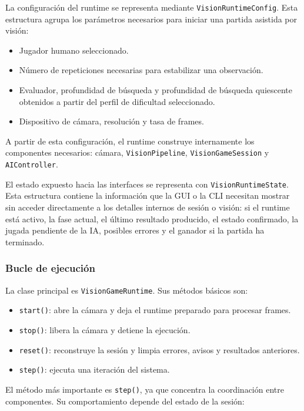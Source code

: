 La configuración del runtime se representa mediante \texttt{VisionRuntimeConfig}. Esta estructura agrupa los parámetros necesarios para iniciar una partida asistida por visión:

\begin{itemize}
    \item Jugador humano seleccionado.
    \item Número de repeticiones necesarias para estabilizar una observación.
    \item Evaluador, profundidad de búsqueda y profundidad de búsqueda quiescente obtenidos a partir del perfil de dificultad seleccionado.
    \item Dispositivo de cámara, resolución y tasa de frames.
\end{itemize}

A partir de esta configuración, el runtime construye internamente los componentes necesarios: cámara, \texttt{VisionPipeline}, \texttt{VisionGameSession} y \texttt{AIController}.

El estado expuesto hacia las interfaces se representa con \texttt{VisionRuntimeState}. Esta estructura contiene la información que la GUI o la CLI necesitan mostrar sin acceder directamente a los detalles internos de sesión o visión: si el runtime está activo, la fase actual, el último resultado producido, el estado confirmado, la jugada pendiente de la IA, posibles errores y el ganador si la partida ha terminado.

\subsubsection{Bucle de ejecución}

La clase principal es \texttt{VisionGameRuntime}. Sus métodos básicos son:

\begin{itemize}
    \item \texttt{start()}: abre la cámara y deja el runtime preparado para procesar frames.
    \item \texttt{stop()}: libera la cámara y detiene la ejecución.
    \item \texttt{reset()}: reconstruye la sesión y limpia errores, avisos y resultados anteriores.
    \item \texttt{step()}: ejecuta una iteración del sistema.
\end{itemize}

El método más importante es \texttt{step()}, ya que concentra la coordinación entre componentes. Su comportamiento depende del estado de la sesión:

